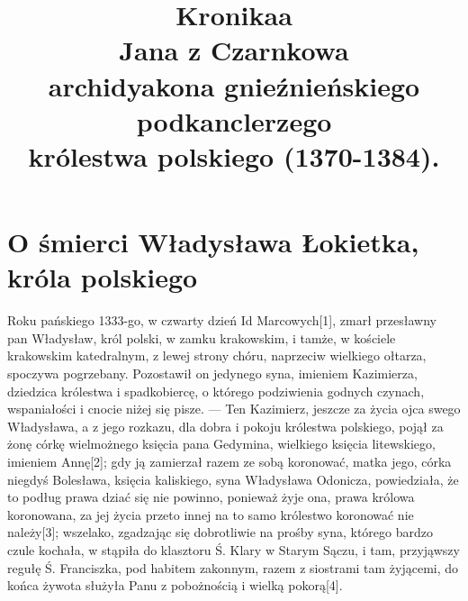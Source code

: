 \documentclass{article}
\begin{document}
\title{%
  Kronikaa \\
  \Large Jana z Czarnkowa \\
  \large archidyakona gnieźnieńskiego podkanclerzego \\ królestwa polskiego (1370-1384).} 

\maketitle

\pagebreak
\section{O śmierci Władysława Łokietka, króla polskiego}
Roku pańskiego 1333-go, w czwarty dzień Id Marcowych[1], zmarł przesławny pan Władysław, król polski, w zamku krakowskim, i tamże, w kościele krakowskim katedralnym, z lewej strony chóru, naprzeciw wielkiego ołtarza, spoczywa pogrzebany. Pozostawił on jedynego syna, imieniem Kazimierza, dziedzica królestwa i spadkobiercę, o którego podziwienia godnych czynach, wspaniałości i cnocie niżej się pisze. — Ten Kazimierz, jeszcze za życia ojca swego Władysława, a z jego rozkazu, dla dobra i pokoju królestwa polskiego, pojął za żonę córkę wielmożnego księcia pana Gedymina, wielkiego księcia litewskiego, imieniem Annę[2]; gdy ją zamierzał razem ze sobą koronować, matka jego, córka niegdyś Bolesława, księcia kaliskiego, syna Władysława Odonicza, powiedziała, że to podług prawa dziać się nie powinno, ponieważ żyje ona, prawa królowa koronowana, za jej życia przeto innej na to samo królestwo koronować nie należy[3]; wszelako, zgadzając się dobrotliwie na prośby syna, którego bardzo czule kochała, w stąpiła do klasztoru Ś. Klary w Starym Sączu, i tam, przyjąwszy regułę Ś. Franciszka, pod habitem zakonnym, razem z siostrami tam żyjącemi, do końca żywota służyła Panu z pobożnością i wielką pokorą[4].
  
\end{document}
